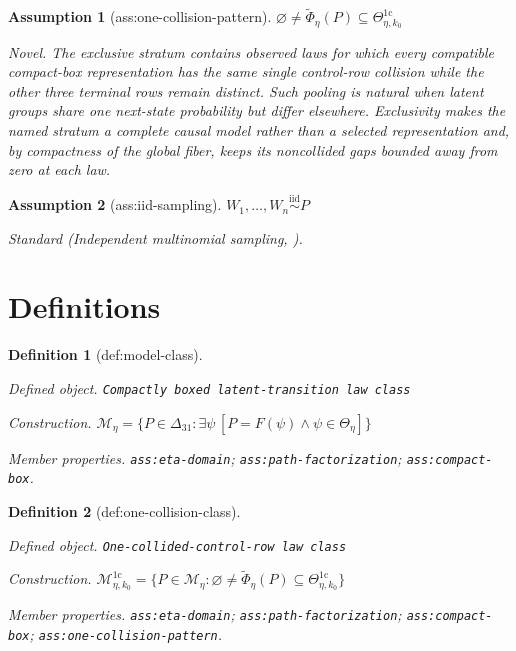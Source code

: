 \documentclass{article}
\newtheorem{assumption}{Assumption}
\newtheorem{definition}{Definition}
\begin{document}
\begin{assumption}[ass:one-collision-pattern]\label{ass:one-collision-pattern}
\(\varnothing\ne\widetilde\Phi_\eta(P)\subseteq\Theta_{\eta,k_0}^{1\mathrm c}\)
\par\smallskip\noindent\emph{Novel.} The exclusive stratum contains observed laws for which every compatible compact-box representation has the same single control-row collision while the other three terminal rows remain distinct. Such pooling is natural when latent groups share one next-state probability but differ elsewhere. Exclusivity makes the named stratum a complete causal model rather than a selected representation and, by compactness of the global fiber, keeps its noncollided gaps bounded away from zero at each law.
\end{assumption}

\begin{assumption}[ass:iid-sampling]\label{ass:iid-sampling}
\(W_1,\ldots,W_n\overset{\mathrm{iid}}{\sim}P\)
\par\smallskip\noindent\emph{Standard} (Independent multinomial sampling, \cite{RomanoShaikh2010}).
\end{assumption}

\section{Definitions}

\begin{definition}[def:model-class]\label{def:model-class}
\par\smallskip\noindent\emph{Defined object.} \texttt{Compactly boxed latent-\allowbreak{}transition law class}
\par\smallskip\noindent\emph{Construction.} \(\mathcal M_\eta=\{P\in\Delta_{31}:\exists\psi\,[P=F(\psi)\land\psi\in\Theta_\eta]\}\)
\par\smallskip\noindent\emph{Member properties.} \texttt{ass:\allowbreak{}eta-\allowbreak{}domain}; \texttt{ass:\allowbreak{}path-\allowbreak{}factorization}; \texttt{ass:\allowbreak{}compact-\allowbreak{}box}.
\end{definition}

\begin{definition}[def:one-collision-class]\label{def:one-collision-class}
\par\smallskip\noindent\emph{Defined object.} \texttt{One-\allowbreak{}collided-\allowbreak{}control-\allowbreak{}row law class}
\par\smallskip\noindent\emph{Construction.} \(\mathcal M_{\eta,k_0}^{1\mathrm c}=\{P\in\mathcal M_\eta:\varnothing\ne\widetilde\Phi_\eta(P)\subseteq\Theta_{\eta,k_0}^{1\mathrm c}\}\)
\par\smallskip\noindent\emph{Member properties.} \texttt{ass:\allowbreak{}eta-\allowbreak{}domain}; \texttt{ass:\allowbreak{}path-\allowbreak{}factorization}; \texttt{ass:\allowbreak{}compact-\allowbreak{}box}; \texttt{ass:\allowbreak{}one-\allowbreak{}collision-\allowbreak{}pattern}.
\end{definition}
\end{document}
